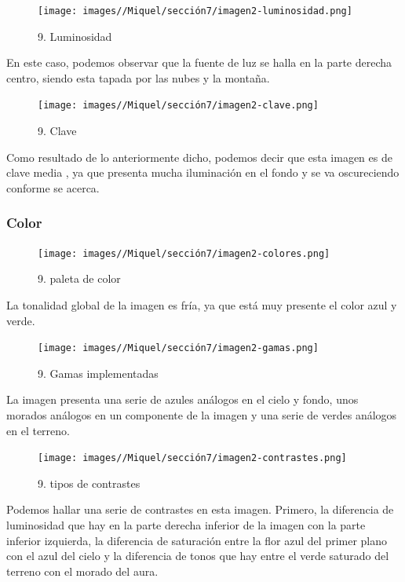 \documentclass[12pt]{article}
\begin{document}
    \begin{figure}[H]
      \centering
      \texttt{[image: images//Miquel/sección7/imagen2-luminosidad.png]}
      \caption{\small 9. Luminosidad}
    \end{figure}

    En este caso, podemos observar que la fuente de luz se halla en la parte derecha centro, siendo esta tapada por las nubes y la montaña.
    
    \begin{figure}[H]
      \centering
      \texttt{[image: images//Miquel/sección7/imagen2-clave.png]}
      \caption{\small 9. Clave}
    \end{figure}

    Como resultado de lo anteriormente dicho, podemos decir que esta imagen es de clave media , ya que presenta mucha iluminación en el fondo y se va oscureciendo conforme se acerca.

        \subsubsection{Color}
\begin{figure}[H]
      \centering
      \texttt{[image: images//Miquel/sección7/imagen2-colores.png]}
      \caption{\small 9. paleta de color}
    \end{figure}

     La tonalidad global de la imagen es fría, ya que está muy presente el color azul y verde.   

\begin{figure}[H]
      \centering
      \texttt{[image: images//Miquel/sección7/imagen2-gamas.png]}
      \caption{\small 9. Gamas implementadas}
    \end{figure}
  
    La imagen presenta una serie de azules análogos en el cielo y fondo, unos morados análogos en un componente de la imagen y una serie de verdes análogos en el terreno.

\begin{figure}[H]
      \centering
      \texttt{[image: images//Miquel/sección7/imagen2-contrastes.png]}
      \caption{\small 9. tipos de contrastes}
    \end{figure}
    
    Podemos hallar una serie de contrastes en esta imagen. Primero, la diferencia de luminosidad que hay en la parte derecha inferior de la imagen con la parte inferior izquierda, la diferencia de saturación entre la flor azul del primer plano con el azul del cielo  y la diferencia de tonos que hay entre el verde saturado del terreno con el morado del aura.
\end{document}

